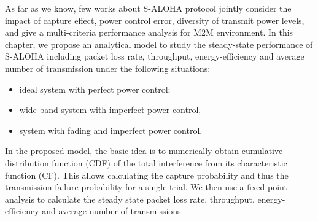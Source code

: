 As far as we know, few works about S-ALOHA protocol jointly consider the impact of capture effect, power control error, diversity of transmit power levels, and give a multi-criteria performance analysis for M2M environment. In this chapter, we propose an analytical model to study the steady-state performance of S-ALOHA including packet loss rate, throughput, energy-efficiency and average number of transmission under the following situations: 
\begin{itemize}
	\item ideal system with perfect power control;
	\item wide-band system with imperfect power control,
	\item system with fading and imperfect power control.
\end{itemize} 
In the proposed model, the basic idea is to numerically obtain cumulative distribution function (CDF) of the total interference from its characteristic function (CF). This allows calculating the capture probability and thus the transmission failure probability for a single trial. We then use a fixed point analysis to calculate the steady state packet loss rate, throughput, energy-efficiency and average number of transmissions.